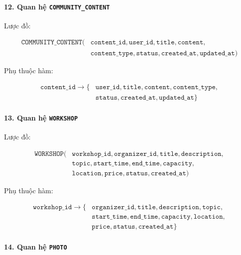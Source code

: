 \paragraph{12. Quan hệ \texttt{COMMUNITY\_CONTENT}}\mbox{}\par

Lược đồ:

$$
\begin{aligned}
\texttt{COMMUNITY\_CONTENT}( & \texttt{content\_id}, \texttt{user\_id}, \texttt{title}, \texttt{content}, \\
& \texttt{content\_type}, \texttt{status}, \texttt{created\_at}, \texttt{updated\_at} )
\end{aligned}
$$

Phụ thuộc hàm:

$$
\begin{aligned}
\texttt{content\_id} \rightarrow \{ & \texttt{user\_id}, \texttt{title}, \texttt{content}, \texttt{content\_type}, \\
& \texttt{status}, \texttt{created\_at}, \texttt{updated\_at} \}
\end{aligned}
$$

\paragraph{13. Quan hệ \texttt{WORKSHOP}}\mbox{}\par

Lược đồ:

$$
\begin{aligned}
\texttt{WORKSHOP}( & \texttt{workshop\_id}, \texttt{organizer\_id}, \texttt{title}, \texttt{description}, \\
& \texttt{topic}, \texttt{start\_time}, \texttt{end\_time}, \texttt{capacity}, \\
& \texttt{location}, \texttt{price}, \texttt{status}, \texttt{created\_at} )
\end{aligned}
$$

Phụ thuộc hàm:

$$
\begin{aligned}
\texttt{workshop\_id} \rightarrow \{ & \texttt{organizer\_id}, \texttt{title}, \texttt{description}, \texttt{topic}, \\
& \texttt{start\_time}, \texttt{end\_time}, \texttt{capacity}, \texttt{location}, \\
& \texttt{price}, \texttt{status}, \texttt{created\_at} \}
\end{aligned}
$$

\paragraph{14. Quan hệ \texttt{PHOTO}}\mbox{}\par

